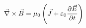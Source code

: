 \documentclass[preview]{standalone}
\begin{document}
\begin{align*}
\special{dvisvgm:raw <g id='unique000'>}\vec{\nabla} \times \vec{B} = \mu_0 \left(\vec{J} +\varepsilon_0 \frac{\partial \vec{E}}{\partial t} \right)\special{dvisvgm:raw </g>}
\end{align*}
\end{document}
